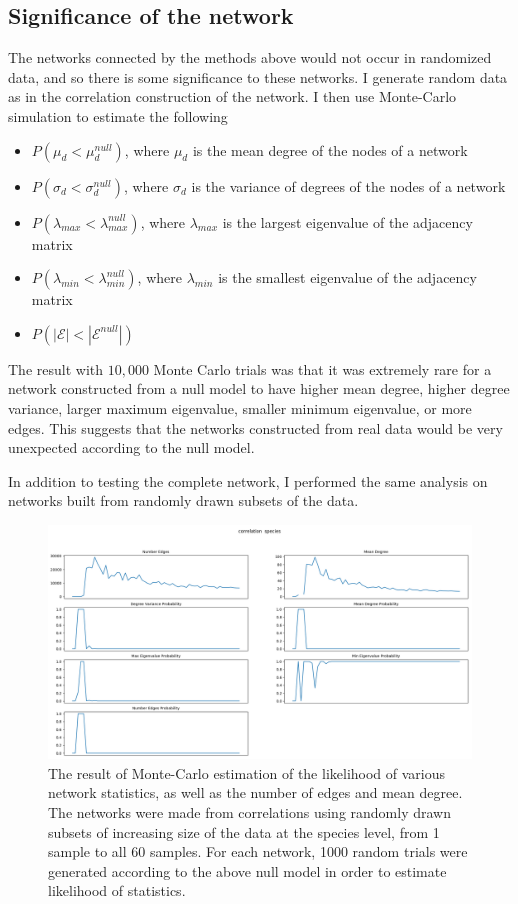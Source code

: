 \documentclass[10pt]{article}
\theoremstyle{definition}
\numberwithin{theorem}{section}
\numberwithin{definition}{section}
\numberwithin{lemma}{section}
\numberwithin{corollary}{section}
\numberwithin{clm}{section}
\numberwithin{rmk}{section}
\newcommand{\cE}{\mathcal{E}}
\begin{document}
\subsection{Significance of the network}
The networks connected by the methods above would not occur in randomized data, and so there is some significance to these networks. I generate random data as in the correlation construction of the network. I then use Monte-Carlo simulation to estimate the following
\begin{itemize}
	\item $P(\mu_d < \mu_d^{null})$, where $\mu_d$ is the mean degree of the nodes of a network
	\item $P(\sigma_d < \sigma_d^{null})$, where $\sigma_d$ is the variance of degrees of the nodes of a network
	\item $P(\lambda_{max} < \lambda_{max}^{null})$, where $\lambda_{max}$ is the largest eigenvalue of the adjacency matrix
	\item $P(\lambda_{min} < \lambda_{min}^{null})$, where $\lambda_{min}$ is the smallest eigenvalue of the adjacency matrix
	\item $P(|\cE| < |\cE^{null}|)$
\end{itemize} 

The result with $10,000$ Monte Carlo trials was that it was extremely rare for a network constructed from a null model to have higher mean degree, higher degree variance, larger maximum eigenvalue, smaller minimum eigenvalue, or more edges. This suggests that the networks constructed from real data would be very unexpected according to the null model. 

In addition to testing the complete network, I performed the same analysis on networks built from randomly drawn subsets of the data.

\begin{figure}
	\includegraphics[scale = 0.4]{../stat_figs/pears_1000__species.png}
	\caption{The result of Monte-Carlo estimation of the likelihood of various network statistics, as well as the number of edges and mean degree. The networks were made from correlations using randomly drawn subsets of increasing size of the data at the species level, from 1 sample to all 60 samples. For each network, 1000 random trials were generated according to the above null model in order to estimate likelihood of statistics.}\label{montecarlos}
\end{figure}
\end{document}

